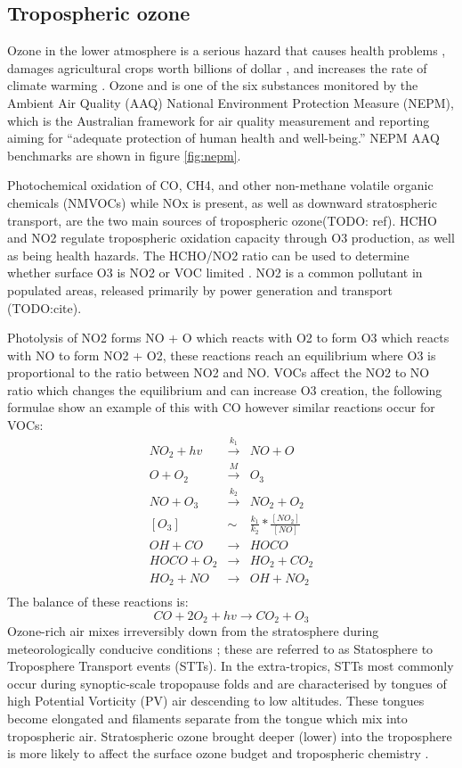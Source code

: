 \subsection{Tropospheric ozone}

Ozone in the lower atmosphere is a serious hazard that causes health problems \cite{Hsieh_2013}, damages agricultural crops worth billions of dollar \cite{Avnery_2011}, and increases the rate of climate warming \cite{IPCC_2013_chap8}. 
Ozone and is one of the six substances monitored by the Ambient Air Quality (AAQ) National Environment Protection Measure (NEPM), which is the Australian framework for air quality measurement and reporting aiming for ``adequate protection of human health and well-being.''
NEPM AAQ benchmarks are shown in figure \ref{fig:nepm}.


Photochemical oxidation of CO, CH4, and other non-methane volatile organic chemicals (NMVOCs) while NOx is present, as well as downward stratospheric transport, are the two main sources of tropospheric ozone(TODO: ref).
HCHO and NO2 regulate tropospheric oxidation capacity through O3 production, as well as being health hazards.
The HCHO/NO2 ratio can be used to determine whether surface O3 is NO2 or VOC limited \cite{Mahajan_2015}.
NO2 is a common pollutant in populated areas, released primarily by power generation and transport (TODO:cite). 

Photolysis of NO2 forms NO + O which reacts with O2 to form O3 which reacts with NO to form NO2 + O2, these reactions reach an equilibrium where O3 is proportional to the ratio between NO2 and NO.
VOCs affect the NO2 to NO ratio which changes the equilibrium and can increase O3 creation, the following formulae show an example of this with CO however similar reactions occur for VOCs:
\begin{eqnarray*}
NO_2 + hv &\overset{k_1}{\rightarrow}& NO + O \\
O + O_2 &\overset{M}{\rightarrow}& O_3 \\
NO + O_3 &\overset{k_2}{\rightarrow}& NO_2 + O_2 \\
[O_3] &\sim& \frac{k_1}{k_2} * \frac{[NO_2]}{[NO]} \\
OH + CO &{\rightarrow}& HOCO \\
HOCO + O_2 &{\rightarrow}& HO_2 + CO_2 \\
HO_2 + NO &{\rightarrow}& OH + NO_2 \\
\end{eqnarray*}
The balance of these reactions is:
$$ CO + 2O_2 + hv {\rightarrow} CO_2 + O_3 $$
Ozone-rich air mixes irreversibly down from the stratosphere during meteorologically conducive conditions \citep{Sprenger2003,Mihalikova2012}; these are referred to as Statosphere to Troposphere Transport events (STTs).
In the extra-tropics, STTs most commonly occur during synoptic-scale tropopause folds \citep{Sprenger2003} and are characterised by tongues of high Potential Vorticity (PV) air descending to low altitudes.
These tongues become elongated and filaments separate from the tongue which mix into tropospheric air.
Stratospheric ozone brought deeper (lower) into the troposphere is more likely to affect the surface ozone budget and tropospheric chemistry \citep{Zanis2003,Langford_2009}.

